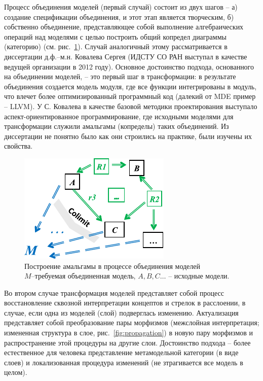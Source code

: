 \documentclass[11pt,draft]{ltxdoc}
\begin{document}
Процесс объединения моделей (первый случай) состоит из двух шагов -- а) создание
спецификации объединения, и этот этап является творческим, б) собственно
объединение, представляющее собой выполнение алгебраических операций над
моделями с целью построить общий копредел диаграммы (категорию) (см. рис.~\ref{fig:amalgama}).  Случай
аналогичный этому рассматривается в диссертации д.ф.--м.н. Ковалева Сергея
(ИДСТУ СО РАН выступал в качестве ведущей организации в 2012 году).  Основное
достоинство подхода, основанного на объединении моделей, -- это первый шаг в трансформации: в
результате объединения создается модель модуля, где все функции интегрированы в
модуль, что влечет более оптимизированный программный код (далекий от MDE пример
-- LLVM).  У С. Ковалева в качестве базовой методики проектирования выступало
аспект-ориентированное программирование, где исходными моделями для
трансформации служили амальгамы (копределы) таких объединений.  Из диссертации
не понятно было как они строились на практике, были изучены их свойства.

\begin{figure}[htbp]
  \centering
  \includegraphics[width=0.5\linewidth]{amalgama}
  \caption{Построение амальгамы в процессе объединения моделей\\[0.3em]
    \protect\footnotesize{$M$--требуемая объединенная модель, $A,B,C\ldots$ -- исходные модели.}}
  \label{fig:amalgama}
\end{figure}

Во втором случае трансформация моделей представляет собой процесс восстановление
сквозной интерпретации концептов и стрелок в расслоении, в случае, если одна из
моделей (слой) подверглась изменению.   Актуализация представляет
собой преобразование пары морфизмов (межслойная интерпретация; измененная
структура в слое, рис.~\ref{fig:propagation}) в новую пару морфизмов и распространение этой
процедуры на другие слои.  Достоинство подхода -- более естественное для
человека представление метамодельной категории (в виде слоев) и локализованная
процедура изменений (не зтрагивается все модель в целом).
\end{document}
